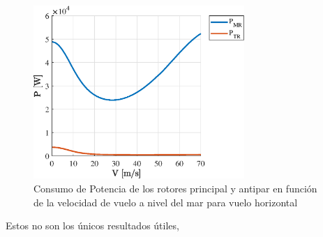\begin{figure}
	\centering
	\includegraphics[width=80mm]{graficos/PVH}
	\caption{Consumo de Potencia de los rotores principal y antipar en función de la velocidad de vuelo a nivel del mar para vuelo horizontal}
	\label{PVH}
\end{figure}

Estos no son los únicos resultados útiles, 
